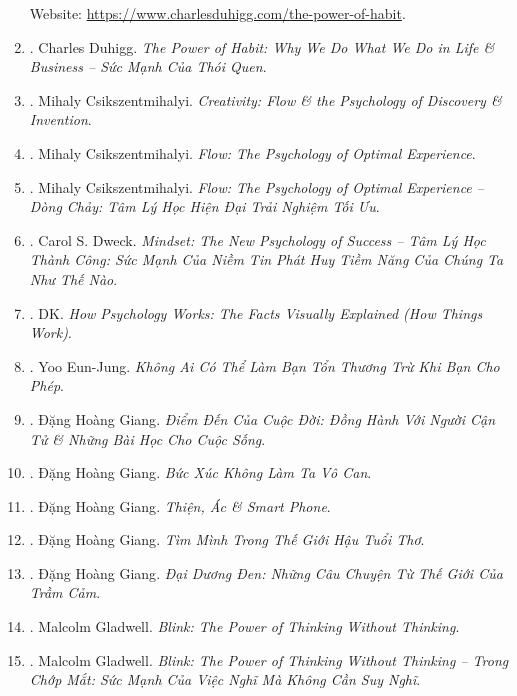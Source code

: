 \documentclass{article}
\begin{document}
\begin{enumerate}
	Website: \url{https://www.charlesduhigg.com/the-power-of-habit}.
	\item \cite{Duhigg_habit_VN}. {\sc Charles Duhigg}. {\it The Power of Habit: Why We Do What We Do in Life \& Business -- Sức Mạnh Của Thói Quen}.\hfill{\sf[done]}
	\item \cite{Csikszentmihalyi_creativity}. {\sc Mihaly Csikszentmihalyi}. {\it Creativity: Flow \& the Psychology of Discovery \& Invention}.\hfill{\sf[reading]}
	\item \cite{Csikszentmihalyi_flow}. {\sc Mihaly Csikszentmihalyi}. {\it Flow: The Psychology of Optimal Experience}.\hfill{\sf[reading]}
	\item \cite{Csikszentmihalyi_flow_VN}. {\sc Mihaly Csikszentmihalyi}. {\it Flow: The Psychology of Optimal Experience -- Dòng Chảy: Tâm Lý Học Hiện Đại Trải Nghiệm Tối Ưu}.\hfill{\sf[done]}
	\item \cite{Dweck_mindset}. Carol S. Dweck. {\it Mindset: The New Psychology of Success -- Tâm Lý Học Thành Công: Sức Mạnh Của Niềm Tin Phát Huy Tiềm Năng Của Chúng Ta Như Thế Nào}.\hfill\hfill{\sf[done]}
	\item \cite{DK2018}. DK. {\it How Psychology Works: The Facts Visually Explained (How Things Work)}.\hfill{\sf[reading]} 
	\item \cite{Eun-Jung_hurt_VN}. Yoo Eun-Jung. {\it Không Ai Có Thể Làm Bạn Tổn Thương Trừ Khi Bạn Cho Phép}.\hfill{\sf[done]} 
	\item \cite{Giang2022a}. {\sc Đặng Hoàng Giang}. {\it Điểm Đến Của Cuộc Đời: Đồng Hành Với Người Cận Tử \& Những Bài Học Cho Cuộc Sống}.\\\mbox{}\hfill{\sf[done]}
	\item \cite{Giang2022b}. {\sc Đặng Hoàng Giang}. {\it Bức Xúc Không Làm Ta Vô Can}.\hfill{\sf[done]}
	\item \cite{Giang2022c}. {\sc Đặng Hoàng Giang}. {\it Thiện, Ác \& Smart Phone}.\hfill{\sf[done]}
	\item \cite{Giang_after_childhood}. {\sc Đặng Hoàng Giang}. {\it Tìm Mình Trong Thế Giới Hậu Tuổi Thơ}.\hfill{\sf[done]}
	\item \cite{Giang_dai_duong_den}. {\sc Đặng Hoàng Giang}. {\it Đại Dương Đen: Những Câu Chuyện Từ Thế Giới Của Trầm Cảm}.\hfill{\sf[done]}
	\item \cite{Gladwell2007}. Malcolm Gladwell. {\it Blink: The Power of Thinking Without Thinking}.\hfill{\sf[reading]}
	\item \cite{Gladwell_blink}. Malcolm Gladwell. {\it Blink: The Power of Thinking Without Thinking -- Trong Chớp Mắt: Sức Mạnh Của Việc Nghĩ Mà Không Cần Suy Nghĩ}.\hfill{\sf[done]}

\end{enumerate}
\end{document}
